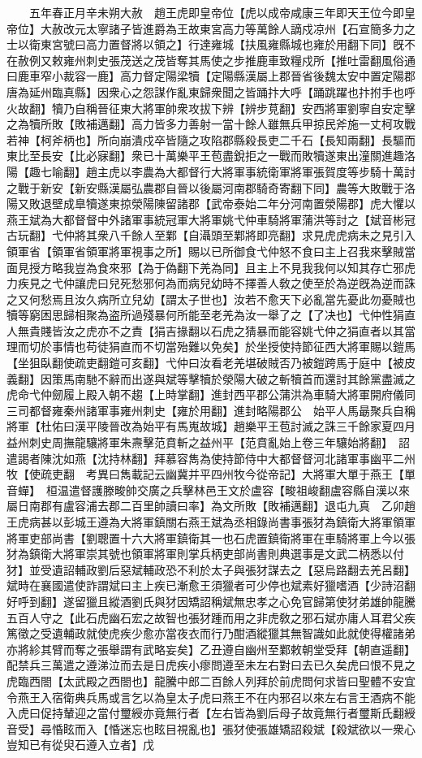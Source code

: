 　　五年春正月辛未朔大赦　趙王虎即皇帝位【虎以成帝咸康三年即天王位今即皇帝位】大赦改元太寧諸子皆進爵為王故東宮高力等萬餘人謫戍凉州【石宣簡多力之士以衛東宮號曰高力置督將以領之】行達雍城【扶風雍縣城也雍於用翻下同】旣不在赦例又敕雍州刺史張茂送之茂皆奪其馬使之步推鹿車致糧戍所【推吐雷翻風俗通曰鹿車窄小裁容一鹿】高力督定陽梁犢【定陽縣漢屬上郡晉省後魏太安中置定陽郡唐為延州臨真縣】因衆心之怨謀作亂東歸衆聞之皆踊抃大呼【踊跳躍也抃拊手也呼火故翻】犢乃自稱晉征東大將軍帥衆攻拔下辨【辨步莧翻】安西將軍劉寧自安定擊之為犢所敗【敗補邁翻】高力皆多力善射一當十餘人雖無兵甲掠民斧施一丈柯攻戰若神【柯斧柄也】所向崩潰戍卒皆隨之攻陷郡縣殺長吏二千石【長知兩翻】長驅而東比至長安【比必寐翻】衆已十萬樂平王苞盡銳拒之一戰而敗犢遂東出潼關進趣洛陽【趣七喻翻】趙主虎以李農為大都督行大將軍事統衛軍將軍張賀度等步騎十萬討之戰于新安【新安縣漢屬弘農郡自晉以後屬河南郡騎奇寄翻下同】農等大敗戰于洛陽又敗退壁成臯犢遂東掠滎陽陳留諸郡【武帝泰始二年分河南置滎陽郡】虎大懼以燕王斌為大都督督中外諸軍事統冠軍大將軍姚弋仲車騎將軍蒲洪等討之【斌音彬冠古玩翻】弋仲將其衆八千餘人至鄴【自灄頭至鄴將即亮翻】求見虎虎病未之見引入領軍省【領軍省領軍將軍視事之所】賜以已所御食弋仲怒不食曰主上召我來擊賊當面見授方略我豈為食來邪【為于偽翻下羌為同】且主上不見我我何以知其存亡邪虎力疾見之弋仲讓虎曰兒死愁邪何為而病兒幼時不擇善人敎之使至於為逆旣為逆而誅之又何愁焉且汝久病所立兒幼【謂太子世也】汝若不愈天下必亂當先憂此勿憂賊也犢等窮困思歸相聚為盗所過殘暴何所能至老羌為汝一舉了之【了决也】弋仲性狷直人無貴賤皆汝之虎亦不之責【狷吉掾翻以石虎之猜暴而能容姚弋仲之狷直者以其當理而切於事情也苟徒狷直而不切當殆難以免矣】於坐授使持節征西大將軍賜以鎧馬【坐狙臥翻使疏吏翻鎧可亥翻】弋仲曰汝看老羌堪破賊否乃被鎧跨馬于庭中【被皮義翻】因策馬南馳不辭而出遂與斌等擊犢於滎陽大破之斬犢首而還討其餘黨盡滅之虎命弋仲劒履上殿入朝不趨【上時掌翻】進封西平郡公蒲洪為車騎大將軍開府儀同三司都督雍秦州諸軍事雍州刺史【雍於用翻】進封略陽郡公　始平人馬朂聚兵自稱將軍【杜佑曰漢平陵晉改為始平有馬嵬故城】趙樂平王苞討滅之誅三千餘家夏四月益州刺史周撫龍驤將軍朱燾擊范賁斬之益州平【范賁亂始上卷三年驤始將翻】　詔遣謁者陳沈如燕【沈持林翻】拜慕容雋為使持節侍中大都督督河北諸軍事幽平二州牧【使疏吏翻　考異曰雋載記云幽冀并平四州牧今從帝記】大將軍大單于燕王【單音蟬】　桓温遣督護滕畯帥交廣之兵擊林邑王文於盧容【畯祖峻翻盧容縣自漢以來屬日南郡有盧容浦去郡二百里帥讀曰率】為文所敗【敗補邁翻】退屯九真　乙卯趙王虎病甚以彭城王遵為大將軍鎮關右燕王斌為丞相錄尚書事張犲為鎮衛大將軍領軍將軍吏部尚書【劉聰置十六大將軍鎮衛其一也石虎置鎮衛將軍在車騎將軍上今以張犲為鎮衛大將軍崇其號也領軍將軍則掌兵柄吏部尚書則典選事是文武二柄悉以付犲】並受遺詔輔政劉后惡斌輔政恐不利於太子與張犲謀去之【惡烏路翻去羌呂翻】斌時在襄國遣使詐謂斌曰主上疾已漸愈王須獵者可少停也斌素好獵嗜酒【少詩沼翻好呼到翻】遂留獵且縱酒劉氏與犲因矯詔稱斌無忠孝之心免官歸第使犲弟雄帥龍騰五百人守之【此石虎幽石宏之故智也張犲踵而用之非虎敎之邪石斌亦庸人耳君父疾篤徵之受遺輔政就使虎疾少愈亦當夜衣而行乃酣酒縱獵其無智識如此就使得權諸弟亦將紾其臂而奪之張舉謂有武略妄矣】乙丑遵自幽州至鄴敕朝堂受拜【朝直遥翻】配禁兵三萬遣之遵涕泣而去是日虎疾小瘳問遵至未左右對曰去已久矣虎曰恨不見之虎臨西閤【太武殿之西閤也】龍騰中郎二百餘人列拜於前虎問何求皆曰聖體不安宜令燕王入宿衛典兵馬或言乞以為皇太子虎曰燕王不在内邪召以來左右言王酒病不能入虎曰促持輦迎之當付璽綬亦竟無行者【左右皆為劉后母子故竟無行者璽斯氏翻綬音受】尋惛眩而入【惛迷忘也眩目視亂也】張犲使張雄矯詔殺斌【殺斌欲以一衆心豈知已有從臾石遵入立者】戊